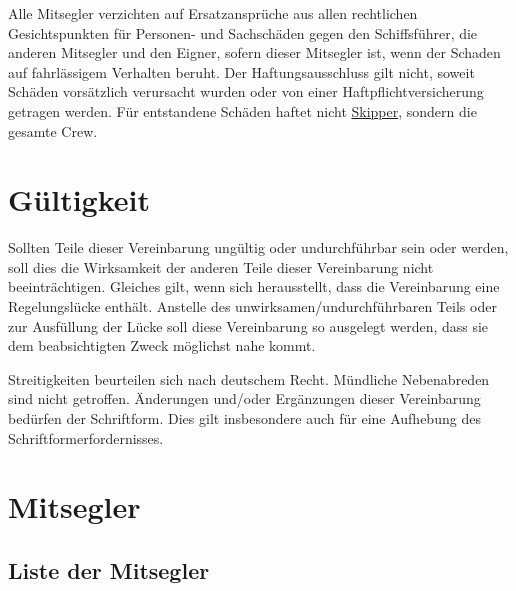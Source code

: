 \documentclass[a4paper,12pt]{article}
\newcommand{\skipper}{\underline{Skipper}}
\begin{document}
Alle Mitsegler verzichten auf Ersatzansprüche aus allen rechtlichen Gesichtspunkten für Per\-so\-nen- und Sachschäden gegen den Schiffsführer, die anderen Mitsegler und den Eigner, sofern dieser Mitsegler ist, wenn der Schaden auf fahrlässigem Verhalten beruht.
Der Haftungsausschluss gilt nicht, soweit Schäden vorsätzlich verursacht wurden oder von einer Haftpflichtversicherung getragen werden.
Für entstandene Schäden haftet nicht \skipper, sondern die gesamte Crew.


\section{Gültigkeit}
\label{sec:Gueltigkeit}

Sollten Teile dieser Vereinbarung ungültig oder undurchführbar sein oder werden, soll dies die Wirksamkeit der anderen Teile dieser Vereinbarung nicht beeinträchtigen.
Gleiches gilt, wenn sich herausstellt, dass die Vereinbarung eine Regelungslücke enthält.
Anstelle des unwirksamen/undurchführbaren Teils oder zur Ausfüllung der Lücke soll diese Vereinbarung so ausgelegt werden, dass sie dem beabsichtigten Zweck möglichst nahe kommt.

Streitigkeiten beurteilen sich nach deutschem Recht.
Mündliche Nebenabreden sind nicht getroffen.
Änderungen und/oder Ergänzungen dieser Vereinbarung bedürfen der Schriftform.
Dies gilt insbesondere auch für eine Aufhebung des Schriftformerfordernisses.


\section{Mitsegler}
\label{sec:Mitsegler}

\subsection*{Liste der Mitsegler}
\end{document}
